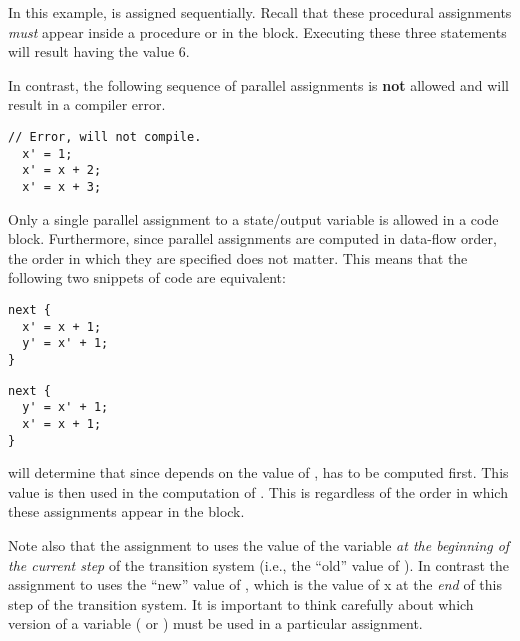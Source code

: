 	In this example,  is assigned sequentially.  Recall that these procedural assignments \emph{must} appear inside a procedure or in the  block. Executing these three statements will result  having the value 6.

    In contrast, the following sequence of parallel assignments is \textbf{not} allowed and will result in a compiler error.
\begin{lstlisting}[language=uclid,style=uclidstyle]
  // Error, will not compile.
  x' = 1;
  x' = x + 2;
  x' = x + 3;
\end{lstlisting}
Only a single parallel assignment to a state/output variable is allowed in a code block. Furthermore, since parallel assignments are computed in data-flow order, the order in which they are specified does not matter. This means that the following two snippets of code are equivalent:

\begin{lstlisting}[language=uclid,style=uclidstyle]
next {
  x' = x + 1;
  y' = x' + 1;
}
\end{lstlisting}

\begin{lstlisting}[language=uclid,style=uclidstyle]
next {
  y' = x' + 1;
  x' = x + 1;
}
\end{lstlisting}

    \uclid{} will determine that since  depends on the value of ,  has to be computed first. This value is then used in the computation of . This is regardless of the order in which these assignments appear in the  block.

    Note also that the assignment to  uses the value of the variable  \emph{at the beginning of the current step} of the transition system (i.e., the ``old'' value of ). In contrast the assignment to  uses the ``new'' value of , which is the value of x at the \emph{end} of this step of the transition system. It is important to think carefully about which version of a variable ( or ) must be used in a particular assignment.


